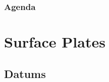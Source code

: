 
\def\PresTitle{Surface Plates}  %
\def\PresSubtitle{Gauges and Measurement}         %
\def\PresAuthor{Brad Peirson}               %
\def\PresInstitute{College of Information Technology and Engineering}       %
\def\PresDate{}                             %
\def\PresKeywords{}                         %





\maketitle              %

\begin{frame}
    \frametitle{Agenda}
    \begingroup
        \setlength{\parskip}{0.3em} 
        
        
        \setcounter{tocdepth}{1} %
    \tableofcontents
    \setcounter{tocdepth}{2} %
    \endgroup
\end{frame}

\section{Surface Plates}

\subsection{Datums}


